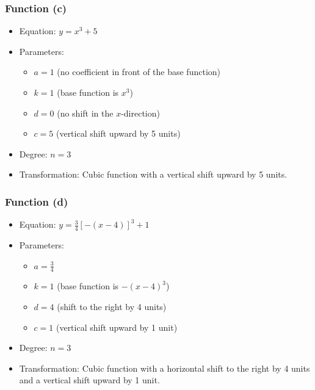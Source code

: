 \documentclass{article}
\begin{document}
\begin{itemize}
\subsubsection*{Function (c)}
\begin{itemize}
    \item Equation: \(y = x^3 + 5\)
    \item Parameters:
    \begin{itemize}
        \item \(a = 1\) (no coefficient in front of the base function)
        \item \(k = 1\) (base function is \(x^3\))
        \item \(d = 0\) (no shift in the \(x\)-direction)
        \item \(c = 5\) (vertical shift upward by 5 units)
    \end{itemize}
    \item Degree: \(n = 3\)
    \item Transformation: Cubic function with a vertical shift upward by 5 units.
\end{itemize}

\subsubsection*{Function (d)}
\begin{itemize}
    \item Equation: \(y = \frac{3}{4}[-(x - 4)]^3 + 1\)
    \item Parameters:
    \begin{itemize}
        \item \(a = \frac{3}{4}\)
        \item \(k = 1\) (base function is \(-(x - 4)^3\))
        \item \(d = 4\) (shift to the right by 4 units)
        \item \(c = 1\) (vertical shift upward by 1 unit)
    \end{itemize}
    \item Degree: \(n = 3\)
    \item Transformation: Cubic function with a horizontal shift to the right by 4 units and a vertical shift upward by 1 unit.
\end{itemize}


\end{itemize}
\end{document}
